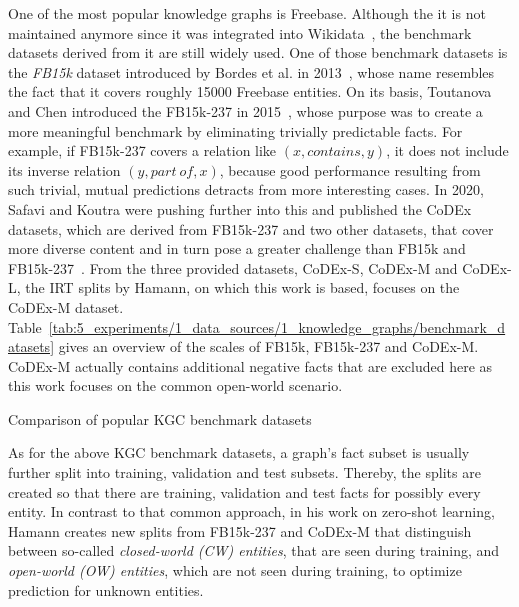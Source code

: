 One of the most popular knowledge graphs is Freebase. Although the it is not maintained anymore since it was integrated into Wikidata~\cite{Tanon2016FromFT}, the benchmark datasets derived from it are still widely used. One of those benchmark datasets is the \emph{FB15k} dataset introduced by Bordes et al. in 2013~\cite{Bordes2013TranslatingEF}, whose name resembles the fact that it covers roughly \num{15000} Freebase entities. On its basis, Toutanova and Chen introduced the FB15k-237 in 2015~\cite{Toutanova2015ObservedVL}, whose purpose was to create a more meaningful benchmark by eliminating trivially predictable facts. For example, if FB15k-237 covers a relation like $(x, contains, y)$, it does not include its inverse relation $(y, part~of, x)$, because good performance resulting from such trivial, mutual predictions detracts from more interesting cases. In 2020, Safavi and Koutra were pushing further into this and published the CoDEx datasets, which are derived from FB15k-237 and two other datasets, that cover more diverse content and in turn pose a greater challenge than FB15k and FB15k-237~\cite{Safavi2020CoDExAC}. From the three provided datasets, CoDEx-S, CoDEx-M and CoDEx-L, the IRT splits by Hamann, on which this work is based, focuses on the CoDEx-M dataset. Table~\ref{tab:5_experiments/1_data_sources/1_knowledge_graphs/benchmark_datasets} gives an overview of the scales of FB15k, FB15k-237 and CoDEx-M. CoDEx-M actually contains additional negative facts that are excluded here as this work focuses on the common open-world scenario.

\begin{table}[h]
    \centering
    
    \caption{Comparison of popular KGC benchmark datasets}
    \label{tab:5_experiments/1_data_sources/1_knowledge_graphs/benchmark_datasets}
\end{table}

As for the above KGC benchmark datasets, a graph's fact subset is usually further split into training, validation and test subsets. Thereby, the splits are created so that there are training, validation and test facts for possibly every entity. In contrast to that common approach, in his work on zero-shot learning, Hamann creates new splits from FB15k-237 and CoDEx-M that distinguish between so-called \emph{closed-world (CW) entities}, that are seen during training, and \emph{open-world (OW) entities}, which are not seen during training, to optimize prediction for unknown entities.

